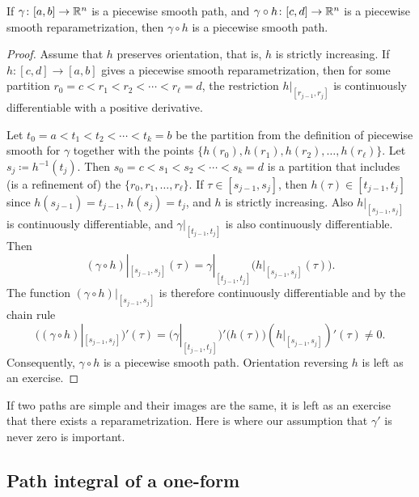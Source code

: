 \begin{prop} \label{prop:reparamapiecewisesmooth}
If $\gamma \colon [a,b] \to {\mathbb{R}}^n$ is a piecewise smooth path,
and $\gamma \circ h \colon [c,d] \to {\mathbb{R}}^n$ is
a piecewise smooth reparametrization, then $\gamma \circ h$
is a piecewise smooth path.
\end{prop}

\begin{proof}
Assume that $h$ preserves orientation, that is, $h$ is strictly
increasing.
If $h \colon [c,d] \to [a,b]$ gives a piecewise smooth reparametrization,
then for some partition
$r_0 = c < r_1 < r_2 < \cdots < r_\ell = d$, the restriction
$h|_{[r_{j-1},r_j]}$ is continuously differentiable with a positive
derivative.

Let $t_0 = a < t_1 < t_2 < \cdots < t_k = b$ be the partition from the
definition of piecewise smooth for $\gamma$ together with the 
points $\{ h(r_0), h(r_1), h(r_2), \ldots, h(r_\ell) \}$.
Let $s_j \coloneqq h^{-1}(t_j)$.  Then
$s_0 = c < s_1 < s_2 < \cdots < s_k = d$
is a partition that includes (is a refinement of) the
$\{ r_0,r_1,\ldots,r_\ell \}$.
If $\tau \in [s_{j-1},s_j]$, then $h(\tau) \in [t_{j-1},t_j]$
since $h(s_{j-1}) = t_{j-1}$,
$h(s_{j}) = t_j$, and
$h$ is strictly increasing.
Also $h|_{[s_{j-1},s_j]}$ is continuously differentiable, and
$\gamma|_{[t_{j-1},t_j]}$ is also continuously differentiable.
Then
\begin{equation*}
(\gamma \circ h)|_{[s_{j-1},s_{j}]} (\tau)
=
\gamma|_{[t_{j-1},t_{j}]} \bigl( h|_{[s_{j-1},s_j]}(\tau) \bigr) .
\end{equation*}
The function 
$(\gamma \circ h)|_{[s_{j-1},s_{j}]}$ is therefore continuously
differentiable and
by the chain rule
\begin{equation*}
\bigl( (\gamma \circ h)|_{[s_{j-1},s_{j}]} \bigr) ' (\tau)
=
\bigl( \gamma|_{[t_{j-1},t_{j}]} \bigr)' \bigl( h(\tau) \bigr)
(h|_{[s_{j-1},s_j]})'(\tau) \not= 0 .
\end{equation*}
Consequently, $\gamma \circ h$ is a piecewise smooth path.
Orientation reversing $h$ is left as an exercise.
\end{proof}

If two paths are simple and their images are the same, it is
left as an exercise that there exists a reparametrization.
Here is where our assumption that $\gamma'$ is never zero is important.

\subsection{Path integral of a one-form}

